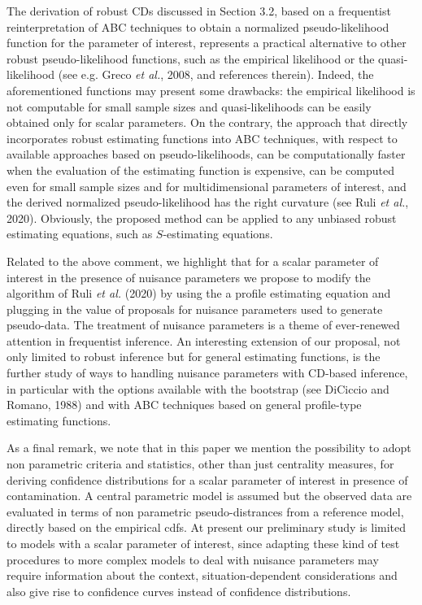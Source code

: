 \documentclass[preprint,12pt,authoryear]{elsarticle}
\begin{document}
The derivation of robust CDs discussed in Section 3.2, based on a frequentist reinterpretation of ABC techniques to obtain a normalized pseudo-likelihood function for the parameter of interest, represents a practical alternative to other robust pseudo-likelihood functions, such as the empirical likelihood or the quasi-likelihood (see e.g. Greco {\em et al.}, 2008, and references therein). Indeed, the aforementioned functions may present some drawbacks: the empirical likelihood is not computable for small sample sizes and quasi-likelihoods can be easily obtained only for scalar parameters. On the contrary, the approach that directly incorporates robust estimating functions into ABC techniques, with respect to available approaches based on pseudo-likelihoods, can be computationally faster when the evaluation of the estimating function is expensive, can be computed even for small sample sizes and for multidimensional parameters of interest, and the derived normalized pseudo-likelihood has the right curvature (see Ruli {\em et al.}, 2020). Obviously, the proposed method can be applied to any unbiased robust estimating equations, such as $S$-estimating equations.

Related to the above comment, we highlight that for a scalar parameter of interest in the presence of nuisance parameters we propose to modify the algorithm of Ruli {\em et al.} (2020) by using the a profile estimating equation and plugging in the value of proposals for nuisance parameters used to generate pseudo-data. The treatment of nuisance parameters is a theme of ever-renewed attention in frequentist inference. An interesting extension of our proposal, not only limited to robust inference but for general estimating functions, is the further study of ways to handling nuisance parameters with CD-based inference, in particular with the options available with the bootstrap {(see DiCiccio and Romano, 1988)} and with ABC techniques based on general profile-type estimating functions.

As a final remark, we note that in this paper we mention the possibility to adopt  non parametric criteria and statistics, other than just centrality measures,  for deriving confidence distributions for a scalar parameter of interest in presence of contamination.
A central parametric model is assumed but  the observed data are evaluated in terms of  non parametric pseudo-distrances from a reference model, directly based on the empirical cdfs.
At present our preliminary study is limited to   models with a scalar parameter of interest, since %
adapting these kind of test procedures to more complex models to deal with nuisance parameters may require information about the context, situation-dependent considerations and also give rise to confidence curves  instead of confidence distributions.
\end{document}
